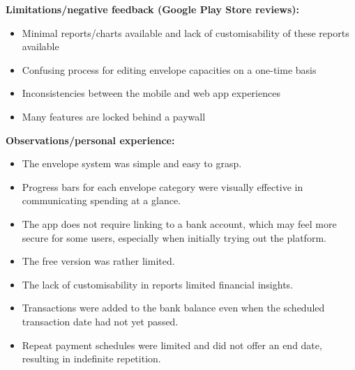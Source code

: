 \documentclass{l4proj}
\begin{document}
\begin{appendices}
\vspace{0.5em}
\textbf{Limitations/negative feedback (Google Play Store reviews):}
\begin{itemize}
    \item Minimal reports/charts available and lack of customisability of these reports available
    \item Confusing process for editing envelope capacities on a one-time basis
    \item Inconsistencies between the mobile and web app experiences
    \item Many features are locked behind a paywall
\end{itemize}

\vspace{0.5em}
\textbf{Observations/personal experience:}
\begin{itemize}
    \item The envelope system was simple and easy to grasp.
    \item Progress bars for each envelope category were visually effective in communicating spending at a glance.
    \item The app does not require linking to a bank account, which may feel more secure for some users, especially when initially trying out the platform.
    \item The free version was rather limited.
    \item The lack of customisability in reports limited financial insights.
    \item Transactions were added to the bank balance even when the scheduled transaction date had not yet passed.
    \item Repeat payment schedules were limited and did not offer an end date, resulting in indefinite repetition.
\end{itemize}




\end{appendices}
\end{document}
